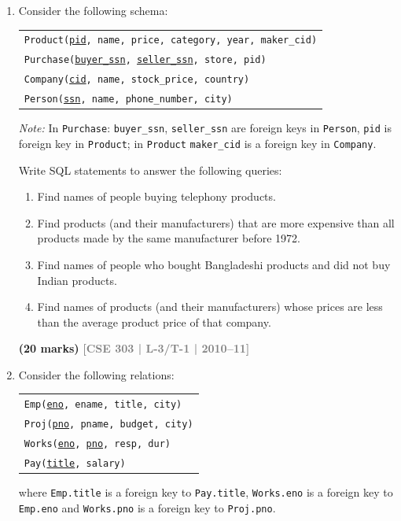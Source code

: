 \documentclass[12pt,a3paper]{article}
\newcommand{\yr}[1]{\hfill\textcolor{gray}{\small\textbf{[#1]}}}
\newcommand{\mk}[1]{\textcolor{orange!70!black}{\small\textbf{(#1 marks)}}}
\begin{document}
\begin{enumerate}

\item Consider the following schema:
\begin{center}
\begin{tabular}{l}
\texttt{Product(\underline{pid}, name, price, category, year, maker\_cid)}\\
\texttt{Purchase(\underline{buyer\_ssn}, \underline{seller\_ssn}, store, pid)}\\
\texttt{Company(\underline{cid}, name, stock\_price, country)}\\
\texttt{Person(\underline{ssn}, name, phone\_number, city)}
\end{tabular}
\end{center}
\textit{Note:} In \texttt{Purchase}: \texttt{buyer\_ssn}, \texttt{seller\_ssn} are foreign keys in \texttt{Person}, \texttt{pid} is foreign key in \texttt{Product}; in \texttt{Product} \texttt{maker\_cid} is a foreign key in \texttt{Company}.

Write SQL statements to answer the following queries:
\begin{enumerate}
  \item Find names of people buying telephony products.
  \item Find products (and their manufacturers) that are more expensive than all products made by the same manufacturer before 1972.
  \item Find names of people who bought Bangladeshi products and did not buy Indian products.
  \item Find names of products (and their manufacturers) whose prices are less than the average product price of that company.
\end{enumerate}
\mk{20} \yr{CSE 303 | L-3/T-1 | 2010--11}

\item Consider the following relations:
\begin{center}
\begin{tabular}{l}
\texttt{Emp(\underline{eno}, ename, title, city)}\\
\texttt{Proj(\underline{pno}, pname, budget, city)}\\
\texttt{Works(\underline{eno}, \underline{pno}, resp, dur)}\\
\texttt{Pay(\underline{title}, salary)}
\end{tabular}
\end{center}
where \texttt{Emp.title} is a foreign key to \texttt{Pay.title}, \texttt{Works.eno} is a foreign key to \texttt{Emp.eno} and \texttt{Works.pno} is a foreign key to \texttt{Proj.pno}.


\end{enumerate}
\end{document}
